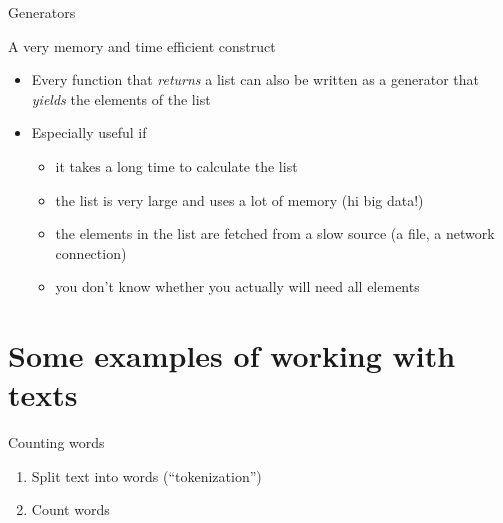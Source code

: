 \documentclass[compress]{beamer}
\begin{document}
\begin{frame}[fragile]{Generators}
	\begin{alertblock}{A very memory and time efficient construct}
		\begin{itemize}
			\item Every function that \emph{returns} a list can also be written as a generator that \emph{yields} the elements of the list
			\item Especially useful if
			\begin{itemize}
				\item it takes a long time to calculate the list
				\item the list is very large and uses a lot of memory (hi big data!)
				\item the elements in the list are fetched from a slow source (a file, a network connection)
				\item you don't know whether you actually will need all elements
			\end{itemize}
		\end{itemize}

		\end{alertblock}

		\end{frame}












\section{Some examples of working with texts}



\begin{frame}{Counting words}
\begin{enumerate}
	\item Split text into words (``tokenization'')
	\item Count words
\end{enumerate}
\end{frame}
\end{document}
